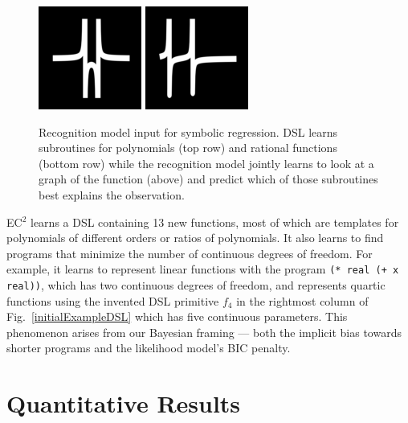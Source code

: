 \documentclass{article}
\newcommand{\system}{\textsc{EC$^2$} }
\newcommand{\code}[1]{{\footnotesize\texttt{#1}}}
\begin{document}
\begin{figure}
  \includegraphics[width = \functionSize]{figures/functions/149.png}
    \includegraphics[width = \functionSize]{figures/functions/187.png}
  \caption{Recognition model input for symbolic regression. DSL learns subroutines for polynomials (top row) and rational functions (bottom row) while the recognition  model jointly learns to look at a graph of the function (above) and predict which of those subroutines best explains the observation.}\label{functions}\vspace{-2cm}
\end{figure}
\system learns a DSL containing 13 new functions,
most of which are templates for polynomials of different orders or ratios of polynomials.
It also learns to find programs that minimize the number of continuous degrees of freedom.
For example, it learns to represent linear functions with the program
\code{(* real (+ x real))}, which has two continuous degrees of freedom, and represents quartic functions using the invented DSL primitive $f_4$ in the rightmost column of Fig.~\ref{initialExampleDSL}
which has five continuous parameters.
This phenomenon arises from our Bayesian framing --- both the implicit bias towards shorter programs and the likelihood model's BIC penalty.


\section{Quantitative Results}\label{quantitative}
\end{document}
